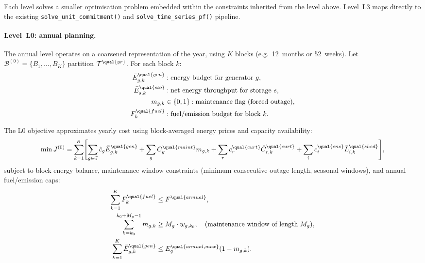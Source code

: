 Each level solves a smaller optimisation problem embedded within the
constraints inherited from the level above.  Level~L3 maps directly to the
existing \texttt{solve\_unit\_commitment()} and
\texttt{solve\_time\_series\_pf()} pipeline.

\paragraph{Level~L0: annual planning.}
The annual level operates on a coarsened representation of the year, using
\(K\) blocks (e.g.\ 12~months or 52~weeks).  Let
\(\mathcal{B}^{(0)}=\{B_1,\dots,B_K\}\) partition
\(\mathcal{T}^{\qual{yr}}\).  For each block \(k\):
\begin{align}
\bar E_{g,k}^{\qual{gen}} &: \text{energy budget for generator } g, \\
\bar E_{s,k}^{\qual{sto}} &: \text{net energy throughput for storage } s, \\
m_{g,k} &\in \{0,1\}: \text{maintenance flag (forced outage)}, \\
F_{k}^{\qual{fuel}} &: \text{fuel/emission budget for block } k.
\label{eq:annual-l0-vars}
\end{align}

The L0 objective approximates yearly cost using block-averaged energy prices
and capacity availability:
\begin{align}
\min J^{(0)} = \sum_{k=1}^{K} \Biggl[
\sum_{g\in\mathcal{G}} \hat c_{g} \bar E_{g,k}^{\qual{gen}}
+ \sum_{g} C_g^{\qual{maint}} m_{g,k}
+ \sum_r c_r^{\qual{curt}} \bar C_{r,k}^{\qual{curt}}
+ \sum_i c_i^{\qual{ens}} \bar L_{i,k}^{\qual{shed}}
\Biggr],
\label{eq:annual-l0-obj}
\end{align}
subject to block energy balance, maintenance window constraints (minimum
consecutive outage length, seasonal windows), and annual fuel/emission caps:
\begin{align}
\sum_{k=1}^{K} F_k^{\qual{fuel}} &\le F^{\qual{annual}}, \\
\sum_{k=k_0}^{k_0+M_g-1} m_{g,k} &\ge M_g \cdot w_{g,k_0},
  \quad \text{(maintenance window of length } M_g), \\
\sum_{k=1}^{K} \bar E_{g,k}^{\qual{gen}} &\le E_g^{\qual{annual,max}}
  (1-m_{g,k}).
\label{eq:annual-l0-constr}
\end{align}

